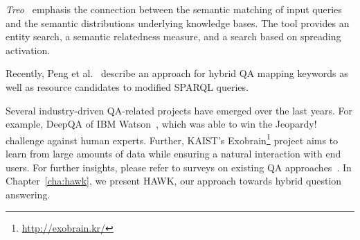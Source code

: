 \emph{Treo}~\cite{treo} emphasis the connection between the semantic matching of input queries and the semantic distributions underlying knowledge bases.
The tool provides an entity search, a semantic relatedness measure, and a search based on spreading activation.

Recently, Peng et al.~\cite{DBLP:journals/corr/PengZZ14} describe an approach for hybrid QA mapping keywords as well as resource candidates to modified SPARQL queries. 




Several industry-driven QA-related projects have emerged over the last years. 
For example, DeepQA of IBM Watson~\cite{watson}, which was able to win the Jeopardy! challenge against human experts. 
Further, {KAIST's Exobrain\footnote{\url{http://exobrain.kr/}}} project aims to learn from large amounts of data while ensuring a natural interaction with end users. 
For further insights, please refer to surveys on existing \ac{QA} approaches~\cite{qasurvey,Kolomiyets:2011,DBLP:journals/semweb/LopezUSM11}.
In Chapter~\ref{cha:hawk}, we present HAWK, our approach towards hybrid question answering. 



